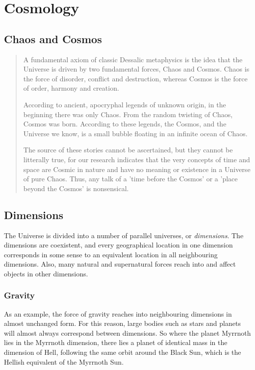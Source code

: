 \chapter{Cosmology}

\section{Chaos and Cosmos}

\begin{quote}
A fundamental axiom of classic Dessalic metaphysics is the idea that the Universe is driven by two fundamental forces, Chaos and Cosmos. Chaos is the force of disorder, conflict and destruction, whereas Cosmos is the force of order, harmony and creation. 

According to ancient, apocryphal legends of unknown origin, in the beginning there was only Chaos. From the random twisting of Chaos, Cosmos was born. According to these legends, the Cosmos, and the Universe we know, is a small bubble floating in an infinite ocean of Chaos. 

The source of these stories cannot be ascertained, but they cannot be litterally true, for our research indicates that the very concepts of time and space are Cosmic in nature and have no meaning or existence in a Universe of pure Chaos. Thus, any talk of a 'time before the Cosmos' or a 'place beyond the Cosmos' is nonsensical. 
\end{quote}


\section{Dimensions}
The Universe is divided into a number of parallel universes, or \emph{dimensions}. The dimensions are coexistent, and every geographical location in one dimension corresponds in some sense to an equivalent location in all neighbouring dimensions. Also, many natural and supernatural forces reach into and affect objects in other dimensions. 

\subsection{Gravity}
As an example, the force of gravity reaches into neighbouring dimensions in almost unchanged form. For this reason, large bodies such as stars and planets will almost always correspond between dimensions. So where the planet Myrrnoth lies in the Myrrnoth dimension, there lies a planet of identical mass in the dimension of Hell, following the same orbit around the Black Sun, which is the Hellish equivalent of the Myrrnoth Sun. 

